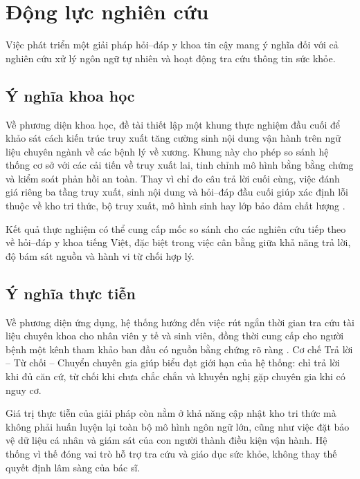 \section{Động lực nghiên cứu}

Việc phát triển một giải pháp hỏi--đáp y khoa tin cậy mang ý nghĩa đối với cả nghiên cứu xử lý ngôn ngữ tự nhiên và hoạt động tra cứu thông tin sức khỏe.

\subsection{Ý nghĩa khoa học}

Về phương diện khoa học, đề tài thiết lập một khung thực nghiệm đầu cuối để khảo sát cách kiến trúc truy xuất tăng cường sinh nội dung vận hành trên ngữ liệu chuyên ngành về các bệnh lý về xương. Khung này cho phép so sánh hệ thống cơ sở với các cải tiến về truy xuất lai, tinh chỉnh mô hình bằng bằng chứng và kiểm soát phản hồi an toàn. Thay vì chỉ đo câu trả lời cuối cùng, việc đánh giá riêng ba tầng truy xuất, sinh nội dung và hỏi--đáp đầu cuối giúp xác định lỗi thuộc về kho tri thức, bộ truy xuất, mô hình sinh hay lớp bảo đảm chất lượng \cite{xiong2024mirage, medrag2024}.

Kết quả thực nghiệm có thể cung cấp mốc so sánh cho các nghiên cứu tiếp theo về hỏi--đáp y khoa tiếng Việt, đặc biệt trong việc cân bằng giữa khả năng trả lời, độ bám sát nguồn và hành vi từ chối hợp lý.

\subsection{Ý nghĩa thực tiễn}

Về phương diện ứng dụng, hệ thống hướng đến việc rút ngắn thời gian tra cứu tài liệu chuyên khoa cho nhân viên y tế và sinh viên, đồng thời cung cấp cho người bệnh một kênh tham khảo ban đầu có nguồn bằng chứng rõ ràng \cite{ortho_rag_13}. Cơ chế Trả lời -- Từ chối -- Chuyển chuyên gia giúp biểu đạt giới hạn của hệ thống: chỉ trả lời khi đủ căn cứ, từ chối khi chưa chắc chắn và khuyến nghị gặp chuyên gia khi có nguy cơ.

Giá trị thực tiễn của giải pháp còn nằm ở khả năng cập nhật kho tri thức mà không phải huấn luyện lại toàn bộ mô hình ngôn ngữ lớn, cũng như việc đặt bảo vệ dữ liệu cá nhân và giám sát của con người thành điều kiện vận hành. Hệ thống vì thế đóng vai trò hỗ trợ tra cứu và giáo dục sức khỏe, không thay thế quyết định lâm sàng của bác sĩ.
